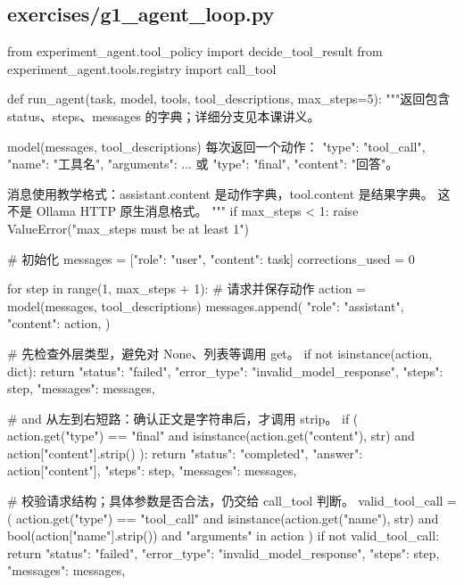 \subsection{exercises/g1\_agent\_loop.py}

\begin{Code}
from experiment_agent.tool_policy import decide_tool_result
from experiment_agent.tools.registry import call_tool


def run_agent(task, model, tools, tool_descriptions, max_steps=5):
    """返回包含 status、steps、messages 的字典；详细分支见本课讲义。

    model(messages, tool_descriptions) 每次返回一个动作：
    {"type": "tool_call", "name": "工具名", "arguments": {...}}
    或 {"type": "final", "content": "回答"}。

    消息使用教学格式：assistant.content 是动作字典，tool.content 是结果字典。
    这不是 Ollama HTTP 原生消息格式。
    """
    if max_steps < 1:
        raise ValueError("max_steps must be at least 1")

    # 初始化
    messages = [{"role": "user", "content": task}]
    corrections_used = 0

    for step in range(1, max_steps + 1):
        # 请求并保存动作
        action = model(messages, tool_descriptions)
        messages.append({
            "role": "assistant",
            "content": action,
        })

        # 先检查外层类型，避免对 None、列表等调用 get。
        if not isinstance(action, dict):
            return {
                "status": "failed",
                "error_type": "invalid_model_response",
                "steps": step,
                "messages": messages,
            }

        # and 从左到右短路：确认正文是字符串后，才调用 strip。
        if (
            action.get("type") == "final"
            and isinstance(action.get("content"), str)
            and action["content"].strip()
        ):
            return {
                "status": "completed",
                "answer": action["content"],
                "steps": step,
                "messages": messages,
            }

        # 校验请求结构；具体参数是否合法，仍交给 call_tool 判断。
        valid_tool_call = (
            action.get("type") == "tool_call"
            and isinstance(action.get("name"), str)
            and bool(action["name"].strip())
            and "arguments" in action
        )
        if not valid_tool_call:
            return {
                "status": "failed",
                "error_type": "invalid_model_response",
                "steps": step,
                "messages": messages,
            }


\end{Code}
